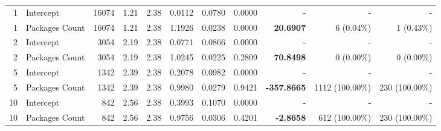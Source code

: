 \begin{landscape}
\begin{table}[H]
\begin{tabular}{r l r r r r r r r r r}
\midrule
1 & Intercept & 16074 & 1.21 & 2.38 & 0.0112 & 0.0780 & 0.0000 & - & - & - \\ 
1 & Packages Count & 16074 & 1.21 & 2.38 & 1.1926 & 0.0238 & 0.0000 & \textbf{20.6907} & 6 (0.04\%) & 1 (0.43\%) \\ 
2 & Intercept & 3054 & 2.19 & 2.38 & 0.0771 & 0.0866 & 0.0000 & - & - & - \\ 
2 & Packages Count & 3054 & 2.19 & 2.38 & 1.0245 & 0.0225 & 0.2809 & \textbf{70.8498} & 0 (0.00\%) & 0 (0.00\%) \\ 
5 & Intercept & 1342 & 2.39 & 2.38 & 0.2078 & 0.0982 & 0.0000 & - & - & - \\ 
5 & Packages Count & 1342 & 2.39 & 2.38 & 0.9980 & 0.0279 & 0.9421 & \textbf{-357.8665} & 1112 (100.00\%) & 230 (100.00\%) \\ 
10 & Intercept & 842 & 2.56 & 2.38 & 0.3993 & 0.1070 & 0.0000 & - & - & - \\ 
10 & Packages Count & 842 & 2.56 & 2.38 & 0.9756 & 0.0306 & 0.4201 & \textbf{-2.8658} & 612 (100.00\%) & 230 (100.00\%) \\ 
\end{tabular}%
\label{tab:codebase_graph_latex_repository_graph_component_time_series_strategy_logistic_regressionSustained_True_packages_20} 
\end{table}
\end{landscape}
\newpage 

 \newpage 
